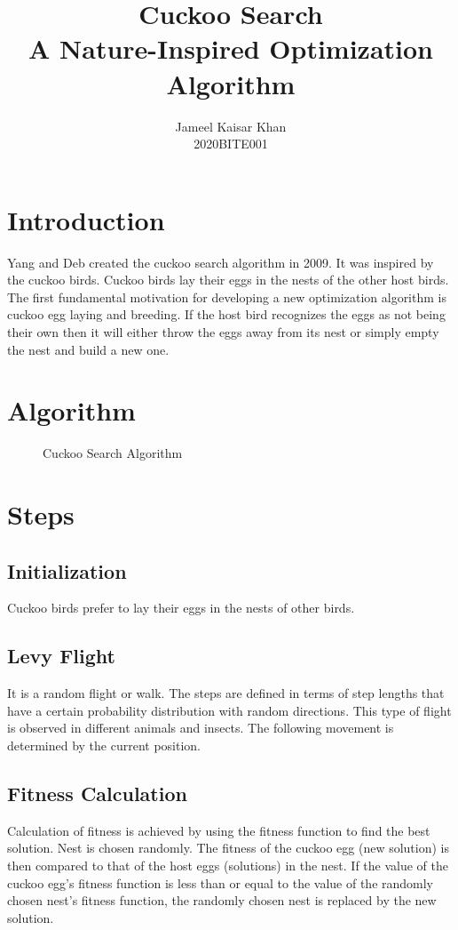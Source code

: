 \documentclass{article}
\title{Cuckoo Search \\ A Nature-Inspired Optimization Algorithm}
\author{Jameel Kaisar Khan \\ 2020BITE001}
\date{}
\begin{document}
\maketitle

\section*{Introduction}

Yang and Deb created the cuckoo search algorithm in 2009. It was inspired by the cuckoo birds. Cuckoo birds lay their eggs in the nests of the other host birds. The first fundamental motivation for developing a new optimization algorithm is cuckoo egg laying and breeding. If the host bird recognizes the eggs as not being their own then it will either throw the eggs away from its nest or simply empty the nest and build a new one.

\section*{Algorithm}

\begin{figure}[H]
    \centering
    
    \caption{Cuckoo Search Algorithm}
    \label{fig:algorithm}
\end{figure}

\newpage

\section*{Steps}

\subsection*{Initialization}
Cuckoo birds prefer to lay their eggs in the nests of other birds.

\subsection*{Levy Flight}
It is a random flight or walk. The steps are defined in terms of step lengths that have a certain probability distribution with random directions. This type of flight is observed in different animals and insects. The following movement is determined by the current position.

\subsection*{Fitness Calculation}
Calculation of fitness is achieved by using the fitness function to find the best solution. Nest is chosen randomly. The fitness of the cuckoo egg (new solution) is then compared to that of the host eggs (solutions) in the nest. If the value of the cuckoo egg’s fitness function is less than or equal to the value of the randomly chosen nest’s fitness function, the randomly chosen nest is replaced by the new solution.
\end{document}
